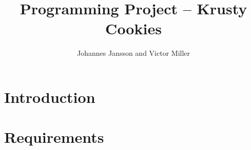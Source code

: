 \documentclass[a4paper]{scrartcl}
\numberwithin{equation}{section}
\begin{document}
\title{Programming Project -- Krusty Cookies}
\author{Johannes Jansson and Victor Miller}
\date{}



\maketitle
\newpage

\section*{Introduction}
\section*{Requirements}

\sec

% 






    

\end{document}
